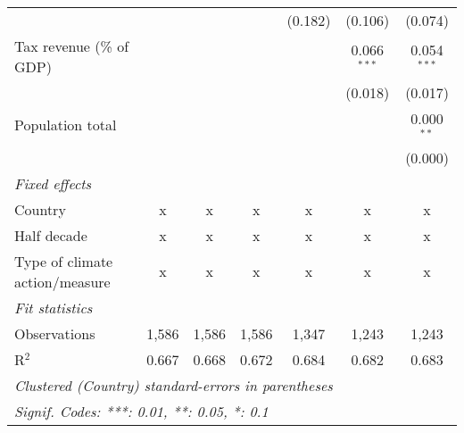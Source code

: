 \begin{tabular}{lcccccc}
                                                               &         &         &                & (0.182)        & (0.106)        & (0.074)\\   
   Tax revenue (\% of GDP)                                     &         &         &                &                & 0.066$^{***}$  & 0.054$^{***}$\\   
                                                               &         &         &                &                & (0.018)        & (0.017)\\   
   Population total                                            &         &         &                &                &                & 0.000$^{**}$\\   
                                                               &         &         &                &                &                & (0.000)\\   
   \emph{Fixed effects}\\
   Country                                                     & x       & x       & x              & x              & x              & x\\  
   Half decade                                                 & x       & x       & x              & x              & x              & x\\  
   Type of climate action/measure                              & x       & x       & x              & x              & x              & x\\  
   \midrule \emph{Fit statistics}\\
   Observations                                                & 1,586   & 1,586   & 1,586          & 1,347          & 1,243          & 1,243\\  
   R$^2$                                                       & 0.667   & 0.668   & 0.672          & 0.684          & 0.682          & 0.683\\  
   \midrule
   \multicolumn{7}{l}{\emph{Clustered (Country) standard-errors in parentheses}}\\
   \multicolumn{7}{l}{\emph{Signif. Codes: ***: 0.01, **: 0.05, *: 0.1}}\\
\end{tabular}
\par\endgroup


